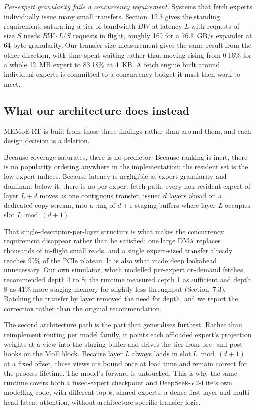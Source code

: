 \emph{Per-expert granularity fails a concurrency requirement.} Systems that fetch
experts individually issue many small transfers. Section~12.3 gives the standing
requirement: saturating a tier of bandwidth $BW$ at latency $L$ with requests of
size $S$ needs $BW \cdot L / S$ requests in flight, roughly 160 for a 76.8~GB/s
expander at 64-byte granularity. Our transfer-size measurement gives the same
result from the other direction, with time spent waiting rather than moving rising
from 0.16\% for a whole 12~MB expert to 83.18\% at 4~KB. A fetch engine built
around individual experts is committed to a concurrency budget it must then work
to meet.

\subsection{What our architecture does instead}

MEMoE-RT is built from those three findings rather than around them, and each
design decision is a deletion.

Because coverage saturates, there is no predictor. Because ranking is inert, there
is no popularity ordering anywhere in the implementation; the resident set is the
low expert indices. Because latency is negligible at expert granularity and
dominant below it, there is no per-expert fetch path: every non-resident expert
of layer $L+d$ moves as one contiguous transfer, issued $d$ layers ahead on a
dedicated copy stream, into a ring of $d+1$ staging buffers where layer $L$
occupies slot $L \bmod (d+1)$.

That single-descriptor-per-layer structure is what makes the concurrency
requirement disappear rather than be satisfied: one large DMA replaces thousands
of in-flight small reads, and a single expert-sized transfer already reaches 90\%
of the PCIe plateau. It is also what made deep lookahead unnecessary. Our own
simulator, which modelled per-expert on-demand fetches, recommended depth 4 to 8;
the runtime measured depth 1 as sufficient and depth 8 as 41\% more staging memory
for slightly less throughput (Section~7.3). Batching the transfer by layer removed
the need for depth, and we report the correction rather than the original
recommendation.

The second architecture path is the part that generalises furthest. Rather than
reimplement routing per model family, it points each offloaded expert's projection
weights at a view into the staging buffer and drives the tier from pre- and
post-hooks on the MoE block. Because layer $L$ always lands in slot
$L \bmod (d{+}1)$ at a fixed offset, those views are bound once at load time and
remain correct for the process lifetime. The model's forward is untouched. This is
why the same runtime covers both a fused-expert checkpoint and DeepSeek-V2-Lite's
own modelling code, with different top-$k$, shared experts, a dense first layer
and multi-head latent attention, without architecture-specific transfer logic.

